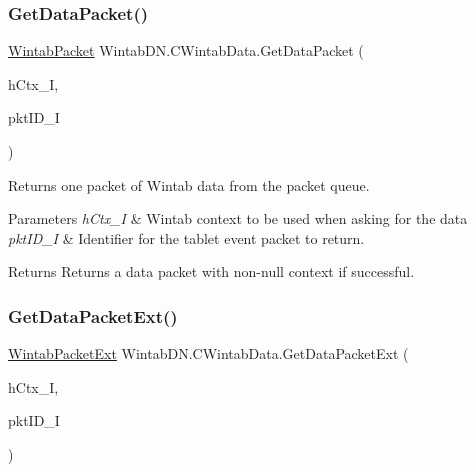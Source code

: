 \subsubsection{\texorpdfstring{Get\+Data\+Packet()}{GetDataPacket()}\hspace{0.1cm}{\footnotesize\ttfamily [2/2]}}
{\footnotesize\ttfamily \mbox{\hyperlink{struct_wintab_d_n_1_1_wintab_packet}{Wintab\+Packet}} Wintab\+D\+N.\+C\+Wintab\+Data.\+Get\+Data\+Packet (\begin{DoxyParamCaption}\item[{U\+Int32}]{h\+Ctx\+\_\+I,  }\item[{U\+Int32}]{pkt\+I\+D\+\_\+I }\end{DoxyParamCaption})\hspace{0.3cm}{\ttfamily [inline]}}



Returns one packet of Wintab data from the packet queue. 


\begin{DoxyParams}{Parameters}
{\em h\+Ctx\+\_\+I} & Wintab context to be used when asking for the data\\
\hline
{\em pkt\+I\+D\+\_\+I} & Identifier for the tablet event packet to return.\\
\hline
\end{DoxyParams}
\begin{DoxyReturn}{Returns}
Returns a data packet with non-\/null context if successful.
\end{DoxyReturn}
\mbox{\label{class_wintab_d_n_1_1_c_wintab_data_a0849e716235d77de44c182fd6b8e46c4}} 
\subsubsection{\texorpdfstring{Get\+Data\+Packet\+Ext()}{GetDataPacketExt()}}
{\footnotesize\ttfamily \mbox{\hyperlink{struct_wintab_d_n_1_1_wintab_packet_ext}{Wintab\+Packet\+Ext}} Wintab\+D\+N.\+C\+Wintab\+Data.\+Get\+Data\+Packet\+Ext (\begin{DoxyParamCaption}\item[{U\+Int32}]{h\+Ctx\+\_\+I,  }\item[{U\+Int32}]{pkt\+I\+D\+\_\+I }\end{DoxyParamCaption})\hspace{0.3cm}{\ttfamily [inline]}}



